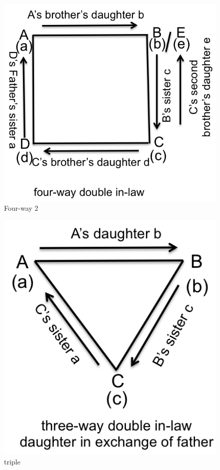 \begin{figure}
\center
\includegraphics{figures/engagement/four_5}
\caption{Four-way 2
\label{figure:engage_5}}
\end{figure}

\begin{figure}
\center
\includegraphics{figures/engagement/triple_6}
\caption{triple 
\label{figure:engage_6}}
\end{figure}

